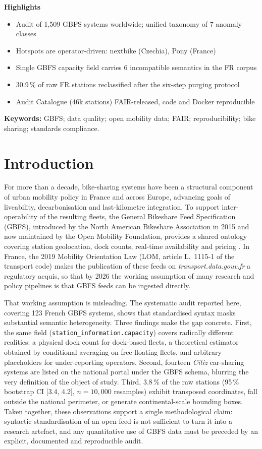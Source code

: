 \documentclass[11pt,a4paper]{article}
\newenvironment{highlights}{%
  \par\noindent\textsf{\bfseries\large Highlights}\par\smallskip
  \begin{itemize}[leftmargin=1.4em,itemsep=0.15em,topsep=0.2em]}{%
  \end{itemize}\par\medskip}
\begin{document}
\begin{highlights}
\item Audit of 1{,}509 GBFS systems worldwide; unified taxonomy of 7 anomaly classes
\item Hotspots are operator-driven: nextbike (Czechia), Pony (France)
\item Single GBFS capacity field carries 6 incompatible semantics in the FR corpus
\item 30.9\,\% of raw FR stations reclassified after the six-step purging protocol
\item Audit Catalogue (46k stations) FAIR-released, code and Docker reproducible
\end{highlights}

\noindent\textbf{Keywords:} GBFS; data quality; open mobility data; FAIR; reproducibility; bike sharing; standards compliance.

\section{Introduction}

For more than a decade, bike-sharing systems have been a structural
component of urban mobility policy in France and across Europe, advancing
goals of liveability, decarbonisation and last-kilometre integration. To
support inter-operability of the resulting fleets, the General Bikeshare
Feed Specification (GBFS), introduced by the North American Bikeshare
Association in 2015 and now maintained by the Open Mobility Foundation,
provides a shared ontology covering station geolocation, dock counts,
real-time availability and pricing
\cite{Mobi2024,OMF2023}. In France, the 2019 Mobility Orientation Law
(LOM, article L.~1115-1 of the transport code) makes the publication of
these feeds on \emph{transport.data.gouv.fr} a regulatory acquis, so
that by 2026 the working assumption of many research and policy
pipelines is that GBFS feeds can be ingested directly.

That working assumption is misleading. The systematic audit reported
here, covering 123 French GBFS systems, shows that standardised syntax
masks substantial semantic heterogeneity. Three findings make the gap
concrete. First, the same field
(\texttt{station\_information.capacity}) covers radically different
realities: a physical dock count for dock-based fleets, a theoretical
estimator obtained by conditional averaging on free-floating fleets, and
arbitrary placeholders for under-reporting operators. Second, fourteen
\emph{Citiz} car-sharing systems are listed on the national portal under
the GBFS schema, blurring the very definition of the object of study.
Third, $3.8\,\%$ of the raw stations (95\,\% bootstrap CI [3.4, 4.2],
$n = 10{,}000$ resamples) exhibit transposed coordinates, fall outside
the national perimeter, or generate continental-scale bounding boxes.
Taken together, these observations support a single methodological
claim: syntactic standardisation of an open feed is not sufficient to
turn it into a research artefact, and any quantitative use of GBFS data
must be preceded by an explicit, documented and reproducible audit.
\end{document}
